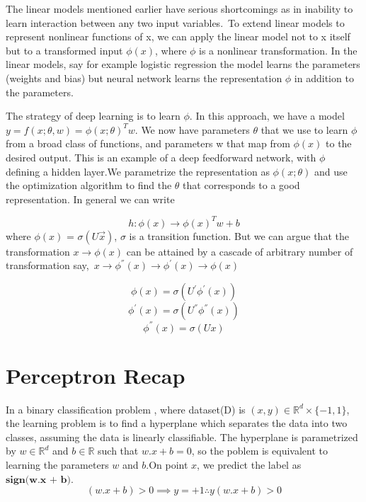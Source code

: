 \documentclass[12pt]{article}
\begin{document}
The linear models mentioned earlier have serious shortcomings as in inability to learn interaction between any  two input variables.\ To extend linear models to represent nonlinear functions of x, we can apply
the linear model not to x itself but to a transformed input $\phi(x)$, where $\phi$ is a nonlinear transformation. In the linear models, say for example logistic regression  the model learns the parameters (weights and bias) but neural network learns the representation $\phi$ in addition to the parameters.

The strategy of deep learning is to learn $\phi$. In this approach, we have a model
$y = f (x; \theta , w ) = \phi(x; \theta)^{T} w $. We now have parameters $\theta$ that we use to learn
$\phi$ from a broad class of functions, and parameters w that map from $\phi(x)$ to
the desired output. This is an example of a deep feedforward network, with
$\phi$ defining a hidden layer.We parametrize the representation as $\phi(x;\theta)$ and use the optimization algorithm to find the $\theta$ that corresponds to a good representation. In general we can write 

$$h : \phi(x) \rightarrow \phi(x)^T w + b$$ where $\phi(x)$ =  $\sigma(U\vec{x} )$, $\sigma$ is a transition function.
But we can argue that the transformation $x \rightarrow \phi(x)$ can be attained by a cascade of arbitrary number of  transformation say,\ $x \rightarrow \phi^{''}(x) \rightarrow \phi^{'}(x) \rightarrow \phi (x)$




$$\phi(x)  =  \sigma(U^{'} \phi^{'}(x))$$  
$$\phi^{'}(x)  =  \sigma(U^{''} \phi^{''}(x))$$ 
$$\phi^{''}(x) = \sigma(Ux)$$

\cleardoublepage

 \section{Perceptron Recap}

In a binary classification problem , where dataset(D) is  $(x,y) \in \mathbb{R}^{d} \times\{-1,1\}$, the  learning problem is to find a hyperplane which separates the data into two classes, 
assuming the data is linearly classifiable. The hyperplane is parametrized by $w\in\mathbb{R}^{d}$ and $ b \in \mathbb{R}$ such that $w.x + b = 0 $, so the poblem is equivalent to learning  the parameters $w$ and $b$.On point $x$, we predict the label as $\textbf{sign(w.x + b)}$.\\
$$(w.x + b) > 0  \implies y = +1 \therefore y(w.x + b) > 0 $$
\end{document}
